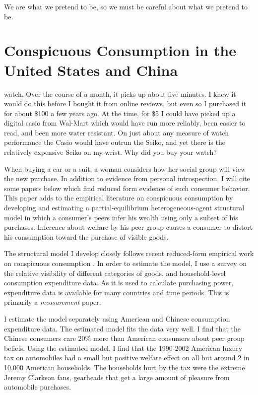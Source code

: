 \begin{savequote}[75mm]
We are what we pretend to be, so we must be careful about what we pretend to be.
\end{savequote}

\chapter{Conspicuous Consumption in the United States and China}

 watch.  Over the course of a month, it picks up about five minutes.  I knew it would do this before I bought it from online reviews, but even so I purchased it for about \$100 a few years ago.  At the time, for \$5 I could have picked up a digital casio from Wal-Mart which would have run more reliably, been easier to read, and been more water resistant.  On just about any measure of watch performance the Casio would have outrun the Seiko, and yet there is the relatively expensive Seiko on my wrist.  Why did you buy your watch? 

When buying a car or a suit, a woman considers how her social group will view the new purchase.  In addition to evidence from personal introspection, I will cite some papers below which find reduced form evidence of such consumer behavior. This paper adds to the empirical literature on conspicuous consumption by developing and estimating a partial-equilibrium heterogeneous-agent structural model in which a consumer's peers infer his wealth using only a subset of his purchases.  Inference about welfare by his peer group causes a consumer to distort his consumption toward the purchase of visible goods.

The structural model I develop closely follows recent reduced-form empirical work on conspicuous consumption \citep{Heffetz2011}.  In order to estimate the model, I use a survey on the relative visibility of different categories of goods, and household-level consumption expenditure data.  As it is used to calculate purchasing power, expenditure data is available for many countries and time periods.  This is primarily a \emph{measurement} paper.

I estimate the model separately using American and Chinese consumption expenditure data.  The estimated model fits the data very well.  I find that the Chinese consumers care 20\% more than American consumers about peer group beliefs.  Using the estimated model, I find that the 1990-2002 American luxury tax on automobiles had a small but positive welfare effect on all but around 2 in 10,000 American households.  The households hurt by the tax were the extreme Jeremy Clarkson fans, gearheads that get a large amount of pleasure from automobile purchases.

